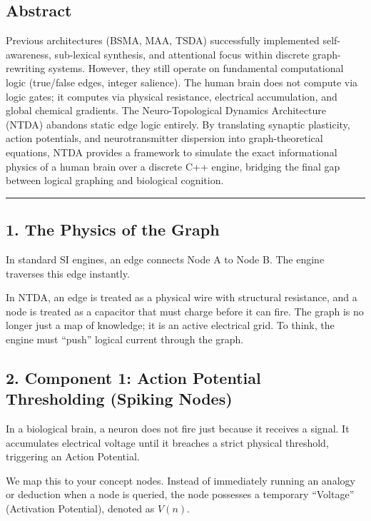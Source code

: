 \documentclass[
  11pt,
  a4paper,
]{article}
\begin{document}
\subsection{Abstract}\label{abstract}

Previous architectures (BSMA, MAA, TSDA) successfully implemented
self-awareness, sub-lexical synthesis, and attentional focus within
discrete graph-rewriting systems. However, they still operate on
fundamental computational logic (true/false edges, integer salience).
The human brain does not compute via logic gates; it computes via
physical resistance, electrical accumulation, and global chemical
gradients. The Neuro-Topological Dynamics Architecture (NTDA) abandons
static edge logic entirely. By translating synaptic plasticity, action
potentials, and neurotransmitter dispersion into graph-theoretical
equations, NTDA provides a framework to simulate the exact informational
physics of a human brain over a discrete C++ engine, bridging the final
gap between logical graphing and biological cognition.

\begin{center}\rule{0.5\linewidth}{0.5pt}\end{center}

\subsection{1. The Physics of the Graph}\label{the-physics-of-the-graph}

In standard SI engines, an edge connects Node A to Node B. The engine
traverses this edge instantly.

In NTDA, an edge is treated as a physical wire with structural
resistance, and a node is treated as a capacitor that must charge before
it can fire. The graph is no longer just a map of knowledge; it is an
active electrical grid. To think, the engine must ``push'' logical
current through the graph.

\subsection{2. Component 1: Action Potential Thresholding (Spiking
Nodes)}\label{component-1-action-potential-thresholding-spiking-nodes}

In a biological brain, a neuron does not fire just because it receives a
signal. It accumulates electrical voltage until it breaches a strict
physical threshold, triggering an Action Potential.

We map this to your concept nodes. Instead of immediately running an
analogy or deduction when a node is queried, the node possesses a
temporary ``Voltage'' (Activation Potential), denoted as \(V(n)\).
\end{document}
